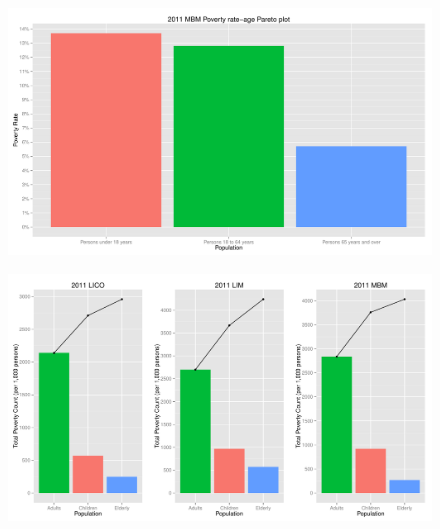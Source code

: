 \documentclass{article}\usepackage[]{graphicx}\usepackage[]{color}
\makeatletter
\def\maxwidth{ %
  \ifdim\Gin@nat@width>\linewidth
    \linewidth
  \else
    \Gin@nat@width
  \fi
}
\newenvironment{knitrout}{}{} %
\makeatother
\begin{document}
\begin{figure}[ht]
\begin{center}
\begin{knitrout}
\color{fgcolor}
\includegraphics[width=\maxwidth]{figure/unnamed-chunk-22} 

\end{knitrout}

\end{center}
\end{figure}
\begin{figure}[ht]
\begin{center}
\begin{knitrout}
\color{fgcolor}
\includegraphics[width=\maxwidth]{figure/unnamed-chunk-23} 

\end{knitrout}

\end{center}
\end{figure}
\end{document}
